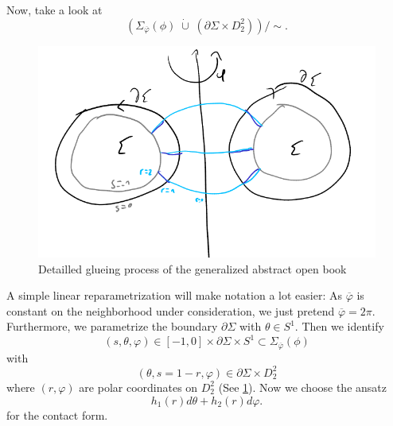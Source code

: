 Now, take a look at
\[
    \left(\Sigma_{\overline{\varphi}}(\phi)\; \dot\cup\; \left(\partial \Sigma \times D_2^2\right)\right)/\sim.
\]
\begin{figure}
    \includegraphics[width=\textwidth]{images/abstract_open_book_gluing.png}
    \caption[Glueing an abstract open book]{Detailled glueing process of the generalized abstract open book}
    \label{fig:abstract_open_book_gluing}
\end{figure}
A simple linear reparametrization will make notation a lot easier: As $\overline{\varphi}$ is constant on the neighborhood under consideration, we just pretend $\overline{\varphi} = 2\pi$.
Furthermore, we parametrize the boundary $\partial \Sigma$ with $\theta \in S^1$.
Then we identify 
\[
    (s, \theta, \varphi) \in [-1,0] \times \partial \Sigma \times S^1 \subset \Sigma_{\overline{\varphi}}(\phi)
\]
with
\[
    (\theta, s = 1-r, \varphi) \in \partial \Sigma \times D_2^2
\]
where $(r, \varphi)$ are polar coordinates on $D_2^2$ 
(See \cref{fig:abstract_open_book_gluing}).
Now we choose the ansatz
\[
    h_1(r) d\theta + h_2(r) d\varphi.
\]
for the contact form.